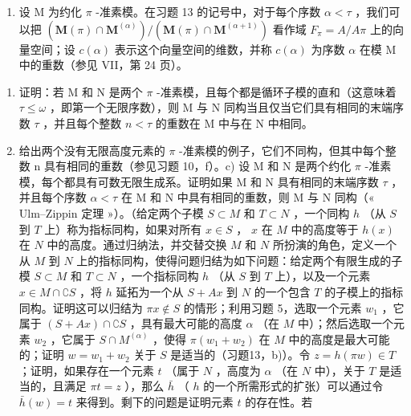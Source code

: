 \begin{enumerate}
\def\labelenumi{\arabic{enumi})}
\setcounter{enumi}{13}
\tightlist
\item
  设 M 为约化 \(\pi\) -准素模。在习题 13 的记号中，对于每个序数 \(\alpha < \tau\) ，我们可以把 \((\mathbf{M}(\pi) \cap \mathbf{M}^{(\alpha)}) / (\mathbf{M}(\pi) \cap \mathbf{M}^{(\alpha + 1)})\) 看作域 \(F_{\pi} = A / A\pi\) 上的向量空间；设 \(c(\alpha)\) 表示这个向量空间的维数，并称 \(c(\alpha)\) 为序数 \(\alpha\) 在模 M 中的重数（参见 VII，第 24 页）。
\end{enumerate}

\begin{enumerate}
\def\labelenumi{\alph{enumi})}
\item
  证明：若 M 和 N 是两个 \(\pi\) -准素模，且每个都是循环子模的直和（这意味着 \(\tau \leqslant \omega\) ，即第一个无限序数），则 M 与 N 同构当且仅当它们具有相同的末端序数 \(\tau\) ，并且每个整数 \(n < \tau\) 的重数在 M 中与在 N 中相同。
\item
  给出两个没有无限高度元素的 \(\pi\) -准素模的例子，它们不同构，但其中每个整数 n 具有相同的重数（参见习题 10，f）。c) 设 M 和 N 是两个约化 \(\pi\) -准素模，每个都具有可数无限生成系。证明如果 M 和 N 具有相同的末端序数 \(\tau\) ，并且每个序数 \(\alpha < \tau\) 在 M 和 N 中具有相同的重数，则 M 与 N 同构（« Ulm–Zippin 定理 »）。（给定两个子模 \(S \subset M\) 和 \(T \subset N\) ，一个同构 \(h\) （从 \(S\) 到 \(T\) 上）称为指标同构，如果对所有 \(x \in S\) ， \(x\) 在 \(M\) 中的高度等于 \(h(x)\) 在 \(N\) 中的高度。通过归纳法，并交替交换 \(M\) 和 \(N\) 所扮演的角色，定义一个从 \(M\) 到 \(N\) 上的指标同构，使得问题归结为如下问题：给定两个有限生成的子模 \(S \subset M\) 和 \(T \subset N\) ，一个指标同构 \(h\) （从 \(S\) 到 \(T\) 上），以及一个元素 \(x \in M \cap \complement S\) ，将 \(h\) 延拓为一个从 \(S + Ax\) 到 \(N\) 的一个包含 \(T\) 的子模上的指标同构。证明这可以归结为 \(\pi x \notin S\) 的情形；利用习题 5，选取一个元素 \(w_1\) ，它属于 \((S + Ax) \cap \complement S\) ，具有最大可能的高度 \(\alpha\) （在 \(M\) 中）；然后选取一个元素 \(w_2\) ，它属于 \(S \cap M^{(\alpha)}\) ，使得 \(\pi(w_1 + w_2)\) 在 \(M\) 中的高度是最大可能的；证明 \(w = w_1 + w_2\) 关于 \(S\) 是适当的（习题13，b)）。令 \(z = h(\pi w) \in T\) ；证明，如果存在一个元素 \(t\) （属于 \(N\) ，高度为 \(\alpha\) （在 \(N\) 中），关于 \(T\) 是适当的，且满足 \(\pi t = z\) ），那么 \(\bar{h}\) （ \(h\) 的一个所需形式的扩张）可以通过令 \(\bar{h}(w) = t\) 来得到。剩下的问题是证明元素 \(t\) 的存在性。若
\end{enumerate}

